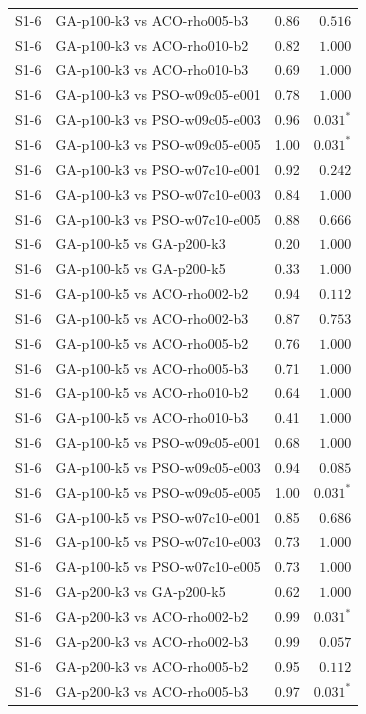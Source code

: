 \begin{tabular}{llrr}
S1-6 & GA-p100-k3 vs ACO-rho005-b3 & 0.86 & $0.516$ \\
S1-6 & GA-p100-k3 vs ACO-rho010-b2 & 0.82 & $1.000$ \\
S1-6 & GA-p100-k3 vs ACO-rho010-b3 & 0.69 & $1.000$ \\
S1-6 & GA-p100-k3 vs PSO-w09c05-e001 & 0.78 & $1.000$ \\
S1-6 & GA-p100-k3 vs PSO-w09c05-e003 & 0.96 & $0.031^{*}$ \\
S1-6 & GA-p100-k3 vs PSO-w09c05-e005 & 1.00 & $0.031^{*}$ \\
S1-6 & GA-p100-k3 vs PSO-w07c10-e001 & 0.92 & $0.242$ \\
S1-6 & GA-p100-k3 vs PSO-w07c10-e003 & 0.84 & $1.000$ \\
S1-6 & GA-p100-k3 vs PSO-w07c10-e005 & 0.88 & $0.666$ \\
S1-6 & GA-p100-k5 vs GA-p200-k3 & 0.20 & $1.000$ \\
S1-6 & GA-p100-k5 vs GA-p200-k5 & 0.33 & $1.000$ \\
S1-6 & GA-p100-k5 vs ACO-rho002-b2 & 0.94 & $0.112$ \\
S1-6 & GA-p100-k5 vs ACO-rho002-b3 & 0.87 & $0.753$ \\
S1-6 & GA-p100-k5 vs ACO-rho005-b2 & 0.76 & $1.000$ \\
S1-6 & GA-p100-k5 vs ACO-rho005-b3 & 0.71 & $1.000$ \\
S1-6 & GA-p100-k5 vs ACO-rho010-b2 & 0.64 & $1.000$ \\
S1-6 & GA-p100-k5 vs ACO-rho010-b3 & 0.41 & $1.000$ \\
S1-6 & GA-p100-k5 vs PSO-w09c05-e001 & 0.68 & $1.000$ \\
S1-6 & GA-p100-k5 vs PSO-w09c05-e003 & 0.94 & $0.085$ \\
S1-6 & GA-p100-k5 vs PSO-w09c05-e005 & 1.00 & $0.031^{*}$ \\
S1-6 & GA-p100-k5 vs PSO-w07c10-e001 & 0.85 & $0.686$ \\
S1-6 & GA-p100-k5 vs PSO-w07c10-e003 & 0.73 & $1.000$ \\
S1-6 & GA-p100-k5 vs PSO-w07c10-e005 & 0.73 & $1.000$ \\
S1-6 & GA-p200-k3 vs GA-p200-k5 & 0.62 & $1.000$ \\
S1-6 & GA-p200-k3 vs ACO-rho002-b2 & 0.99 & $0.031^{*}$ \\
S1-6 & GA-p200-k3 vs ACO-rho002-b3 & 0.99 & $0.057$ \\
S1-6 & GA-p200-k3 vs ACO-rho005-b2 & 0.95 & $0.112$ \\
S1-6 & GA-p200-k3 vs ACO-rho005-b3 & 0.97 & $0.031^{*}$ \\

\end{tabular}
